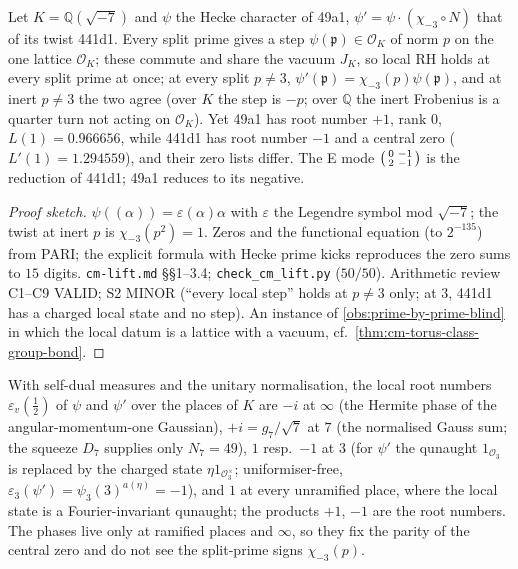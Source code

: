 \begin{proposition}
\label{prop:gkp-cm-local-not-global} 
Let $K = \mathbb Q(\sqrt{-7})$ and $\psi$ the Hecke character of 49a1, $\psi' = \psi\cdot(\chi_{-3}\circ N)$ that of its twist 441d1. Every split prime gives a step %
$\psi(\mathfrak p)\in\mathcal O_K$ of norm $p$ on the one lattice $\mathcal O_K$; these commute and share the vacuum $J_K$, so local RH holds at every split prime at once; at %
every split $p\ne3$, $\psi'(\mathfrak p) = \chi_{-3}(p)\psi(\mathfrak p)$, and at inert $p\ne3$ the two agree (over $K$ the step is $-p$; over $\mathbb Q$ the inert Frobenius is %
a quarter turn not acting on $\mathcal O_K$). Yet 49a1 has root number $+1$, rank $0$, $L(1) = 0.966656$, while 441d1 has root number $-1$ and a central zero ($L'(1) =
1.294559$), and their zero lists differ. The E mode $\begin{psmallmatrix}0&-1\\2&-1\end{psmallmatrix}$ is the reduction of 441d1; 49a1 reduces to its negative.
\end{proposition}
\begin{proof}[Proof sketch] $\psi((\alpha)) = \varepsilon(\alpha)\alpha$ with $\varepsilon$ the Legendre symbol mod $\sqrt{-7}$; the twist at inert $p$ is $\chi_{-3}(p^2) = 1$. %
Zeros and the functional equation (to $2^{-135}$) from PARI; the explicit formula with Hecke prime kicks reproduces the zero sums to $15$ digits. \texttt{cm-lift.md} \S\S1--3.4;
\texttt{check\_cm\_lift.py} ($50/50$). Arithmetic review C1--C9 VALID; S2 MINOR (``every local step'' holds at $p\ne3$ only; at $3$, 441d1 has a charged local state and no step).
An instance of \cref{obs:prime-by-prime-blind} in which the local datum is a lattice with a vacuum, cf.\ \cref{thm:cm-torus-class-group-bond}.
\end{proof}
\begin{proposition}
\label{prop:gkp-gate-phases-root-number} 
With self-dual measures and the unitary normalisation, the local root numbers $\varepsilon_v(\tfrac12)$ of $\psi$ and $\psi'$ over the places of $K$ are $-i$ at $\infty$ (the %
Hermite phase of the angular-momentum-one Gaussian), $+i = g_7/\sqrt7$ at $7$ (the normalised Gauss sum; the squeeze $D_7$ supplies only $N_7 = 49$), $1$ resp.\ $-1$ at $3$ (for
$\psi'$ the qunaught $1_{\mathcal O_3}$ is replaced by the charged state $\eta1_{\mathcal O_3^\times}$; uniformiser-free, $\varepsilon_3(\psi') = \psi_3(3)^{a(\eta)} = -1$), and %
$1$ at every unramified place, where the local state is a Fourier-invariant qunaught; the products $+1$, $-1$ are the root numbers. The phases live only at ramified places and
$\infty$, so they fix the parity of the central zero and do not see the split-prime signs $\chi_{-3}(p)$.
\end{proposition}
